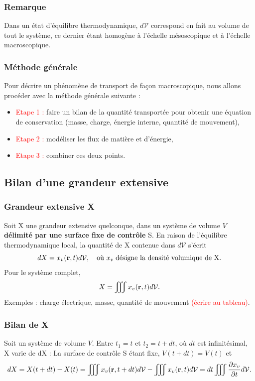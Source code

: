 \documentclass[11pt,a4paper]{report}
\begin{document}
	\subsubsection*{Remarque}
	Dans un état d'équilibre thermodynamique, $d\mathcal{V}$ correspond en fait au volume de tout 		le système, ce dernier étant homogène à l'échelle mésoscopique et à l'échelle macroscopique.
	
	\subsubsection*{Méthode générale}
	Pour décrire un phénomène de transport de façon macroscopique, nous allons procéder avec la 		méthode générale suivante :
	\begin{itemize}
	\item \textcolor{red}{Etape 1 :} faire un bilan de la quantité transportée pour obtenir une 			équation de conservation (masse, charge, énergie interne, quantité de mouvement),
	\item \textcolor{red}{Etape 2 :} modéliser les flux de matière et d'énergie,
	\item \textcolor{red}{Etape 3 :} combiner ces deux points.
	\end{itemize}

\subsection{Bilan d'une grandeur extensive}

\subsubsection{Grandeur extensive X}
Soit X une grandeur extensive quelconque, dans un système de volume $V$ \textbf{délimité par une surface fixe de contrôle} S. En raison de l'équilibre thermodynamique local, la quantité de X contenue dans $d\mathcal{V}$ s'écrit
\begin{equation}
	dX = x_v(\bold{r},t)d\mathcal{V}, \quad\text{où }x_v\;\text{désigne la densité volumique de X}.
\end{equation}
Pour le système complet,
\begin{equation}
	X = \iiint x_v(\bold{r},t) d\mathcal{V}.
\end{equation}
Exemples : charge électrique, masse, quantité de mouvement \textcolor{red}{(écrire au tableau)}.

\subsubsection{Bilan de X}
Soit un système de volume $V$. Entre $t_1 = t$ et $t_2 = t + dt$, où $dt$ est infinitésimal, X varie de dX :
La surface de contrôle S étant fixe, $V(t+dt) = V(t)$ et
\begin{equation}
	dX = X(t+dt) - X(t) 
	= \iiint x_v(\bold{r},t+dt) d\mathcal{V} - \iiint x_v(\bold{r},t) d\mathcal{V}
	= dt \iiint \frac{\partial x_v}{\partial t} d\mathcal{V}.\\
\end{equation}
\end{document}
